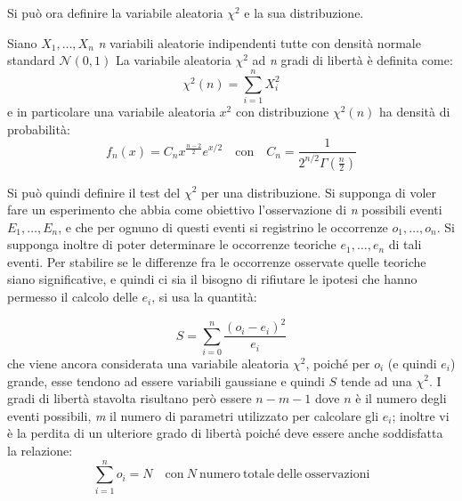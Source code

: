 		\noindent Si può ora definire la variabile aleatoria $\chi ^ 2$ e la sua distribuzione.
		\begin{defn}
		Siano $X_1,\ldots , X_n$ \textit{n} variabili aleatorie indipendenti tutte con densità normale standard $\mathcal{N}(0,1)$
		La variabile aleatoria $\chi ^ 2$ ad \textit{n} gradi di libertà è definita come:
		\[\chi ^ 2(n) = \sum_{i=1}^n X^2_i\]
		e in particolare una variabile aleatoria $x^2$ con distribuzione $\chi ^{2}(n)$ ha densità di probabilità:
		\[f_{n}(x)=C_n x^{\frac{n-2}{2}}e^{x / 2} \quad \mathrm{con} \quad C_n=\frac{1}{2^{n / 2}\Gamma(\frac{n}{2})} \]
		\end{defn}
		\noindent Si può quindi definire il test del $\chi ^2$ per una distribuzione. Si supponga di voler fare un esperimento che abbia come obiettivo l'osservazione di \textit{n} possibili eventi $E_1, \ldots , E_n$, e che per ognuno di questi eventi si registrino le occorrenze $o_1, \ldots , o_n$. Si supponga inoltre di poter determinare le occorrenze teoriche $e_1, \ldots , e_n$ di tali eventi. Per stabilire se le differenze fra le occorrenze osservate quelle teoriche siano significative, e quindi ci sia il bisogno di rifiutare le ipotesi che hanno permesso il calcolo delle $e_i$, si usa la quantità:
		
			\[S=\sum^{n}_{i=0}\frac{(o_i-e_i)^2}{e_i}\]
			che viene ancora considerata una variabile aleatoria $\chi ^ 2$, poiché per $o_i$ (e quindi $e_i$) grande, esse tendono ad essere variabili gaussiane e quindi $S$ tende ad una $\chi ^ 2$. I gradi di libertà stavolta risultano però essere $n-m-1$ dove $n$ è il numero degli eventi possibili, \textit{m} il numero di parametri utilizzato per calcolare gli $e_i$; inoltre vi è la perdita di un ulteriore grado di libertà poiché deve essere anche soddisfatta la relazione:
			\[\sum_{i=1}^n o_i = N \quad \mathrm{con} \: N \: \mathrm{numero} \:  \mathrm{totale} \: \mathrm{delle} \: \mathrm{osservazioni}\]
\newpage